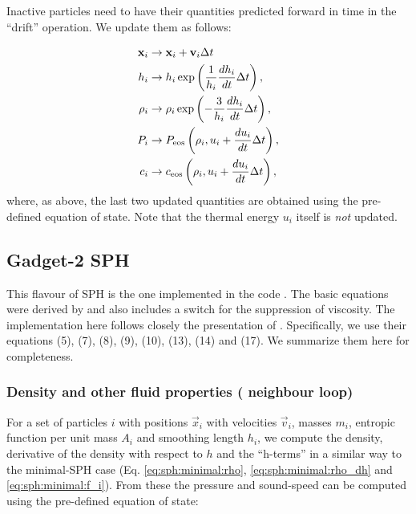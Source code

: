 Inactive particles need to have their quantities predicted forward in
time in the ``drift'' operation. We update them as follows:

\begin{align}
  \vec{x}_i &\rightarrow \vec{x}_i + \vec{v}_i \Delta t  \label{eq:sph:minimal:drift_x} \\
  h_i &\rightarrow h_i \exp\left(\frac{1}{h_i} \frac{dh_i}{dt}
  \Delta t\right), \label{eq:sph:minimal:drift_h}\\
  \rho_i &\rightarrow \rho_i \exp\left(-\frac{3}{h_i} \frac{dh_i}{dt}
  \Delta t\right), \label{eq:sph:minimal:drift_rho} \\
  P_i &\rightarrow P_{\rm eos}\left(\rho_i, u_i + \frac{du_i}{dt} \Delta t\right), \label{eq:sph:minimal:drift_P}\\
  c_i &\rightarrow c_{\rm eos}\left(\rho_i, u_i + \frac{du_i}{dt}
  \Delta t\right) \label{eq:sph:minimal:drift_c},
\end{align}
where, as above, the last two updated quantities are obtained using
the pre-defined equation of state. Note that the thermal energy $u_i$
itself is \emph{not} updated.


\subsection{Gadget-2 SPH}
\label{sec:sph:gadget2}

This flavour of SPH is the one implemented in the  code
\citep{Springel2005}. The basic equations were derived by
\cite{Springel2002} and also includes a \cite{Balsara1995} switch for
the suppression of viscosity. The implementation here follows closely the
presentation of \cite{Springel2005}. Specifically, we use their equations (5), (7),
(8), (9), (10), (13), (14) and (17). We summarize them here for completeness.

\subsubsection{Density and other fluid properties ( neighbour loop)}

For a set of particles $i$ with positions $\vec{x}_i$ with velocities
$\vec{v}_i$, masses $m_i$, entropic function per unit mass $A_i$ and
smoothing length $h_i$, we compute the density, derivative of the density with respect
to $h$ and the ``h-terms'' in a similar way to the minimal-SPH case
(Eq. \ref{eq:sph:minimal:rho}, \ref{eq:sph:minimal:rho_dh} and
\ref{eq:sph:minimal:f_i}). From these the pressure and sound-speed can
be computed using the pre-defined equation of state:

